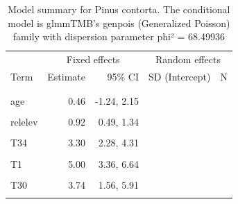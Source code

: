 \documentclass[
]{article}
\begin{document}
\begin{longtable}[t]{lrrrr}
\caption{\label{tab:summaries-tables}\label{tab:Pc}Model summary for Pinus contorta. The conditional model is glmmTMB's genpois (Generalized Poisson) family with dispersion parameter phi² = 68.49936}\\
\toprule
\multicolumn{1}{c}{ } & \multicolumn{2}{c}{Fixed effects} & \multicolumn{2}{c}{Random effects} \\
\cmidrule(l{3pt}r{3pt}){2-3} \cmidrule(l{3pt}r{3pt}){4-5}
Term & Estimate & 95\% CI & SD (Intercept) & N\\
\midrule
\addlinespace[0.3em]
\multicolumn{5}{l}{\textbf{Conditional model}}\\
\hspace{1em}\cellcolor{gray!6}{Intercept} & \cellcolor{gray!6}{-7.11} & \cellcolor{gray!6}{-8.9, -5.31} & \cellcolor{gray!6}{} & \cellcolor{gray!6}{}\\
\hspace{1em}age & 0.46 & -1.24, 2.15 &  & \\
\hspace{1em}\cellcolor{gray!6}{bio19} & \cellcolor{gray!6}{-1.73} & \cellcolor{gray!6}{-3.46, 0.01} & \cellcolor{gray!6}{} & \cellcolor{gray!6}{}\\
\hspace{1em}relelev & 0.92 & 0.49, 1.34 &  & \\
\hspace{1em}\cellcolor{gray!6}{artificial} & \cellcolor{gray!6}{4.64} & \cellcolor{gray!6}{3.81, 5.47} & \cellcolor{gray!6}{} & \cellcolor{gray!6}{}\\
\hspace{1em}T34 & 3.30 & 2.28, 4.31 &  & \\
\hspace{1em}\cellcolor{gray!6}{V1} & \cellcolor{gray!6}{0.51} & \cellcolor{gray!6}{-0.4, 1.41} & \cellcolor{gray!6}{} & \cellcolor{gray!6}{}\\
\hspace{1em}T1 & 5.00 & 3.36, 6.64 &  & \\
\hspace{1em}\cellcolor{gray!6}{T40} & \cellcolor{gray!6}{2.90} & \cellcolor{gray!6}{2.36, 3.44} & \cellcolor{gray!6}{} & \cellcolor{gray!6}{}\\
\hspace{1em}T30 & 3.74 & 1.56, 5.91 &  & \\
\hspace{1em}\cellcolor{gray!6}{V8} & \cellcolor{gray!6}{1.52} & \cellcolor{gray!6}{-2.08, 5.12} & \cellcolor{gray!6}{} & \cellcolor{gray!6}{}\\

\end{longtable}
\end{document}
